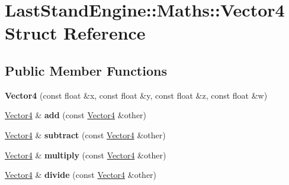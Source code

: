 \hypertarget{structLastStandEngine_1_1Maths_1_1Vector4}{}\section{Last\+Stand\+Engine\+:\+:Maths\+:\+:Vector4 Struct Reference}
\label{structLastStandEngine_1_1Maths_1_1Vector4}
\subsection*{Public Member Functions}
\begin{DoxyCompactItemize}
\item 
\hypertarget{structLastStandEngine_1_1Maths_1_1Vector4_a7be24056ae5e2e5187fa10dc763d12d1}{}{\bfseries Vector4} (const float \&x, const float \&y, const float \&z, const float \&w)\label{structLastStandEngine_1_1Maths_1_1Vector4_a7be24056ae5e2e5187fa10dc763d12d1}

\item 
\hypertarget{structLastStandEngine_1_1Maths_1_1Vector4_a7c23233c2ebee27a74ae211da760e7f6}{}\hyperlink{structLastStandEngine_1_1Maths_1_1Vector4}{Vector4} \& {\bfseries add} (const \hyperlink{structLastStandEngine_1_1Maths_1_1Vector4}{Vector4} \&other)\label{structLastStandEngine_1_1Maths_1_1Vector4_a7c23233c2ebee27a74ae211da760e7f6}

\item 
\hypertarget{structLastStandEngine_1_1Maths_1_1Vector4_a597b0860a5bf5f6b6cbb9028795c36aa}{}\hyperlink{structLastStandEngine_1_1Maths_1_1Vector4}{Vector4} \& {\bfseries subtract} (const \hyperlink{structLastStandEngine_1_1Maths_1_1Vector4}{Vector4} \&other)\label{structLastStandEngine_1_1Maths_1_1Vector4_a597b0860a5bf5f6b6cbb9028795c36aa}

\item 
\hypertarget{structLastStandEngine_1_1Maths_1_1Vector4_a4e30d61b029b438043acf6778ec04ff2}{}\hyperlink{structLastStandEngine_1_1Maths_1_1Vector4}{Vector4} \& {\bfseries multiply} (const \hyperlink{structLastStandEngine_1_1Maths_1_1Vector4}{Vector4} \&other)\label{structLastStandEngine_1_1Maths_1_1Vector4_a4e30d61b029b438043acf6778ec04ff2}

\item 
\hypertarget{structLastStandEngine_1_1Maths_1_1Vector4_a4fe0cfaa2741306cea5e092defa72177}{}\hyperlink{structLastStandEngine_1_1Maths_1_1Vector4}{Vector4} \& {\bfseries divide} (const \hyperlink{structLastStandEngine_1_1Maths_1_1Vector4}{Vector4} \&other)\label{structLastStandEngine_1_1Maths_1_1Vector4_a4fe0cfaa2741306cea5e092defa72177}


\end{DoxyCompactItemize}
